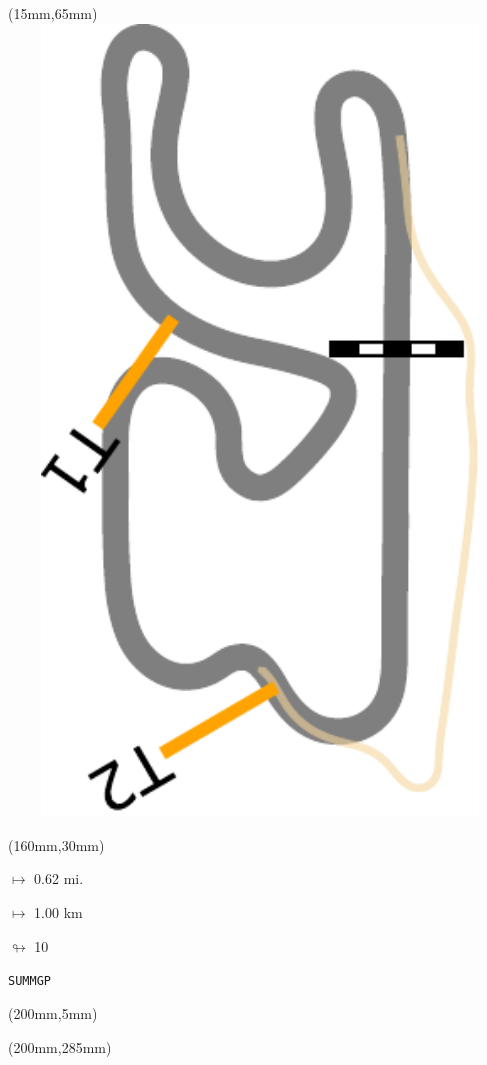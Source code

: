 \begin{textblock*}{185mm}(15mm,65mm)%
\centering
\mbox{\includegraphics[width=185mm,height=210mm,keepaspectratio]{PT/SUMMGP.pdf}}
\end{textblock*}
\begin{textblock*}{40mm}(160mm,30mm)%
\Large
\par$\mapsto$ 0.62 mi.
\par$\mapsto$ 1.00 km
\par$\looparrowright$ 10
\par\hfill\tiny\tt SUMMGP\\
\end{textblock*}
\begin{textblock*}{20mm}(200mm,5mm)%
\fbox{\thepage}
\label{SUMMGP}
\end{textblock*}
\begin{textblock*}{20mm}(200mm,285mm)%
\fbox{\thepage}
\end{textblock*}

